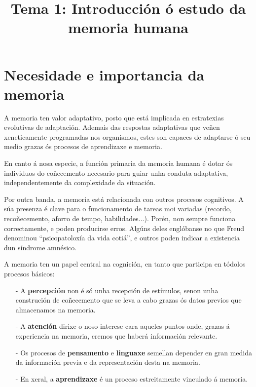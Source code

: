 \documentclass[a4paper,11pt]{article}
\title{Tema 1: Introducción ó estudo da memoria humana}
\date{}
\begin{document}
  

\maketitle 

\section{Necesidade e importancia da memoria}
A memoria ten valor adaptativo, posto que está implicada en estratexias evolutivas de adaptación. Ademais das respostas adaptativas que veñen xeneticamente programadas nos organismos, estes son capaces de adaptarse ó seu medio grazas ós procesos de aprendizaxe e memoria.

En canto á nosa especie, a función primaria da memoria humana é dotar ós individuos do coñecemento necesario para guiar unha conduta adaptativa, independentemente da complexidade da situación.

Por outra banda, a memoria está relacionada con outros procesos cognitivos. A súa presenza é clave para o funcionamento de tareas moi variadas (recordo, recoñecemento, aforro de tempo, habilidades...). Porén, non sempre funciona correctamente, e poden producirse erros. Algúns deles englóbanse no que Freud denominou ``psicopatoloxía da vida cotiá'', e outros poden indicar a existencia dun síndrome amnésico.

A memoria ten un papel central na cognición, en tanto que participa en tódolos procesos básicos:

\begin{itemize}
	\item[-] A \textbf{percepción} non é só unha recepción de estímulos, senon unha construción de 			coñecemento que se leva a cabo grazas ós datos previos que almacenamos na memoria. 
	\item[-] A \textbf{atención} dirixe o noso interese cara aqueles puntos onde, grazas á 					experiencia na memoria, cremos que haberá información relevante.
	\item[-] Os procesos de \textbf{pensamento} e \textbf{linguaxe} semellan depender en gran medida 		da información previa e da representación desta na memoria. 
	\item[-] En xeral, a \textbf{aprendizaxe} é un proceso estreitamente vinculado á memoria.
\end{itemize}
\end{document}
